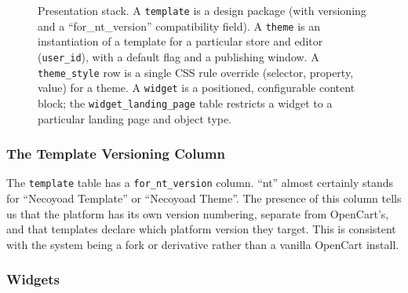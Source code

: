 \documentclass[11pt,a4paper]{article}
\begin{document}
\begin{figure}[htbp]
\centering
{}
\caption{Presentation stack. A \texttt{template} is a design package
(with versioning and a ``for\_nt\_version'' compatibility field).
A \texttt{theme} is an instantiation of a template for a particular
store and editor (\texttt{user\_id}), with a default flag and a
publishing window. A \texttt{theme\_style} row is a single CSS
rule override (selector, property, value) for a theme. A
\texttt{widget} is a positioned, configurable content block; the
\texttt{widget\_landing\_page} table restricts a widget to a
particular landing page and object type.}
\label{fig:themes}
\end{figure}

\subsubsection{The Template Versioning Column}

The \texttt{template} table has a \texttt{for\_nt\_version}
column. ``nt'' almost certainly stands for ``Necoyoad
Template'' or ``Necoyoad Theme''. The presence of this
column tells us that the platform has its own version
numbering, separate from OpenCart's, and that templates
declare which platform version they target. This is
consistent with the system being a fork or derivative
rather than a vanilla OpenCart install.

\subsubsection{Widgets}
\end{document}
